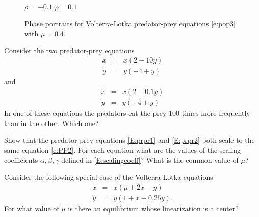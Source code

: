 \documentclass{ximera}
\begin{document}
\begin{figure}[htb]
           \centerline{%
	   }
		\vspace*{-0.2in}		
		\hspace{1.0in} $\rho=-0.1$ \hspace{2.5in} $\rho=0.1$
           \caption{Phase portraits for Volterra-Lotka predator-prey 
		equations \protect\eqref{e:pop3} with $\mu=0.4$.}
           \label{F:pop3}
\end{figure}

\EXER

\TEXER

\begin{exercise} \label{c9.1.5}
Consider the two predator-prey equations
\begin{equation} \label{E:prpr1}
\begin{array}{rcl}
\dot{x} & = & x(2-10y)\\
\dot{y} & = & y(-4+y)
\end{array}
\end{equation}
and 
\begin{equation} \label{E:prpr2}
\begin{array}{rcl}
\dot{x} & = & x(2-0.1y)\\
\dot{y} & = & y(-4+y)
\end{array}
\end{equation}
In one of these equations the predators eat the prey 100 times more 
frequently than in the other.  Which one?
\end{exercise}

\begin{exercise} \label{c9.1.6}
Show that the predator-prey equations \eqref{E:prpr1} and \eqref{E:prpr2} both 
scale to the same equation \eqref{e:PP2}.  For each equation what are the 
values of the scaling coefficients $\alpha,\beta,\gamma$ defined in 
\eqref{E:scalingcoeff}?  What is the common value of $\mu$?
\end{exercise}



\begin{exercise} \label{c9.1.2}
Consider the following special case of the Volterra-Lotka equations 
\begin{eqnarray*}
\dot{x} & = & x(\mu + 2x -     y)  \\
\dot{y} & = & y(  1 +  x - 0.25y).
\end{eqnarray*}
For what value of $\mu$ is there an equilibrium whose linearization is a 
center?   
\end{exercise}
\end{document}
